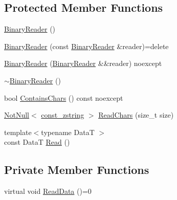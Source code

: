 \subsection*{Protected Member Functions}
\begin{DoxyCompactItemize}
\item 
\mbox{\hyperlink{classmage_1_1_binary_reader_aab82579cef4f2f022273cf1adfcc8497}{Binary\+Reader}} ()
\item 
\mbox{\hyperlink{classmage_1_1_binary_reader_a8c1ff948f1d056439f3d8cc37d7f507c}{Binary\+Reader}} (const \mbox{\hyperlink{classmage_1_1_binary_reader}{Binary\+Reader}} \&reader)=delete
\item 
\mbox{\hyperlink{classmage_1_1_binary_reader_a520841747b74b4b0e95f8d9b595492fa}{Binary\+Reader}} (\mbox{\hyperlink{classmage_1_1_binary_reader}{Binary\+Reader}} \&\&reader) noexcept
\item 
\mbox{\hyperlink{classmage_1_1_binary_reader_a42e6c31bc53f5214675f845756b5a404}{$\sim$\+Binary\+Reader}} ()
\item 
bool \mbox{\hyperlink{classmage_1_1_binary_reader_af68b85b30fbe8b5f2d4720163a658ab5}{Contains\+Chars}} () const noexcept
\item 
\mbox{\hyperlink{namespacemage_a8769f9d670d6b585ea306cb1062af94b}{Not\+Null}}$<$ \mbox{\hyperlink{namespacemage_abfd9206dc607ceb5d13ec68bf075a5c0}{const\+\_\+zstring}} $>$ \mbox{\hyperlink{classmage_1_1_binary_reader_ad2bed0756a38358fc4a8b10b02007af8}{Read\+Chars}} (size\+\_\+t size)
\item 
{\footnotesize template$<$typename DataT $>$ }\\const DataT \mbox{\hyperlink{classmage_1_1_binary_reader_ad914ec3edfef7a9e9976ef706be44b92}{Read}} ()
\end{DoxyCompactItemize}
\subsection*{Private Member Functions}
\begin{DoxyCompactItemize}
\item 
virtual void \mbox{\hyperlink{classmage_1_1_binary_reader_a67157828a9781644fb55bd7f3558f07c}{Read\+Data}} ()=0
\end{DoxyCompactItemize}
